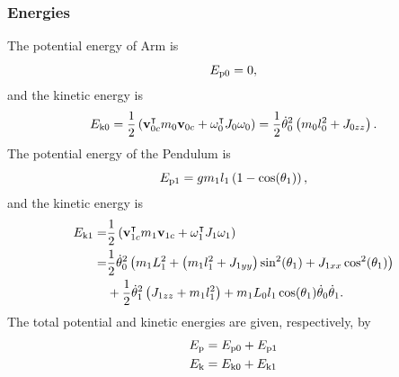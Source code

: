 \subsubsection{Energies}
The potential energy of Arm is
\begin{equation}
	E _{\text{p0}} = 0,
\end{equation}
and the kinetic energy is
\begin{equation}
	E _{\text{k0}} = \frac{1}{2}\left( \text{\textbf{v}}_{0c}^\intercal m_0\textbf{v}_{0c} + \omega_0^\intercal J_0\omega_0  \right) = 
	\frac{1}{2}\dot{\theta}_0^2\left(  m_0l_0^2+J_{0zz}  \right).
\end{equation}
The potential energy of the Pendulum is
\begin{equation}
E _{\text{p1}} = gm_1l_1\left( 1-\cos(\theta_1) \right),
\end{equation}
and the kinetic energy is
\begin{equation}
\begin{split}
	E _{\text{k1}} = &\frac{1}{2}\left( \text{\textbf{v}}_{1c}^\intercal m_1\textbf{v}_{1c} + \omega_1^\intercal J_1\omega_1  \right)\\
	= &\frac{1}{2}\dot{\theta}_0^2\left( m_1L_1^2+\left( m_1l_1^2+J_{1yy} \right)\sin^2(\theta_1)+J_{1xx}\cos^2(\theta_1) \right)\\
	&+\frac{1}{2}\dot{\theta}_1^2\left(  J_{1zz}+m_1l_1^2  \right)+m_1L_0l_1\cos(\theta_1)\dot{\theta}_0\dot{\theta}_1.
\end{split}
\end{equation}
The total potential and kinetic energies are given, respectively, by
\begin{subequations}
	\begin{align}
		E _{\text{p}} &= E _{\text{p0}} + E _{\text{p1}} \\
		E _{\text{k}} &= E _{\text{k0}} + E _{\text{k1}}
	\end{align}
\end{subequations}
